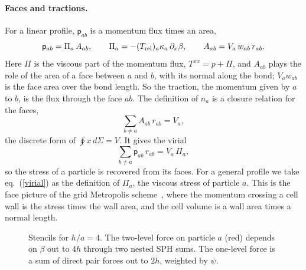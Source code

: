 \documentclass[11pt,aps,preprint,nofootinbib,superscriptaddress,tightenlines]{revtex4-2}
\def\st{\begin{equation}}
\def\stp{\end{equation}}
\def\Eq#1{eq.~(\ref{#1})}
\let\oldparagraph\paragraph
\renewcommand{\paragraph}{\par\bigskip\oldparagraph}
\begin{document}
\paragraph{Faces and tractions.}  For a linear profile, $\mathsf p_{ab}$ is a
momentum flux times an area,
\st
\mathsf p_{ab}=\Pi_a\,A_{ab},\qquad
\Pi_a=-(T_{\rm rel})_a\kappa_a\,\partial_x\beta,\qquad
A_{ab}=V_a\,w_{ab}\,r_{ab} .
\label{tface}
\stp
Here $\Pi$ is the viscous part of the momentum flux, $T^{xx}=p+\Pi$, and
$A_{ab}$ plays the role of the area of a face between $a$ and $b$, with its
normal along the bond; $V_aw_{ab}$ is the face area over the bond length.  So the traction, the momentum given by $a$ to $b$, is the flux
through the face $ab$.  The definition of $n_a$ is a closure
relation for the faces,
\st
\sum_{b\neq a}A_{ab}\,r_{ab}=V_a ,
\stp
the discrete form of $\oint x\,d\Sigma=V$.  It gives the virial
\st
\sum_{b\neq a}\mathsf p_{ab}\,r_{ab}=V_a\,\Pi_a ,
\label{virial}
\stp
so the stress of a particle is recovered from its faces.  For a general profile
we take \Eq{virial} as the definition of $\Pi_a$, the viscous stress of
particle $a$.  This is the face
picture of the grid Metropolis scheme~\cite{BhambureSinghTeaney2025}, where
the momentum crossing a cell wall is the stress times the wall area, and the
cell volume is a wall area times a normal length.

\begin{figure}[t]
\centering
{}
\caption{Stencils for $h/a=4$.  The two-level force on particle $a$ (red)
depends on $\beta$ out to $4h$ through two nested SPH sums.  The one-level
force is a sum of direct pair forces out to $2h$, weighted by $\psi$.}
\label{fig:stencil}
\end{figure}
\end{document}
